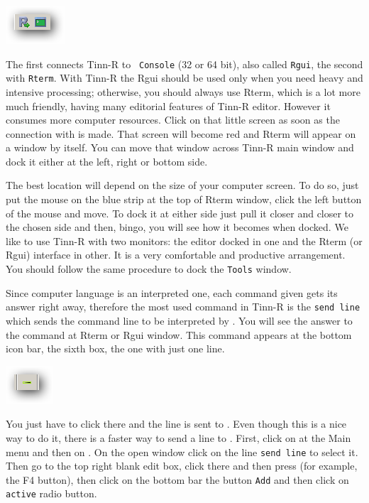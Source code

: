 \includegraphics[scale=0.50]{./res/secrets_connecting.png}

The first connects Tinn-R to \texttt{\RR{} Console} (32 or 64 bit), also called \texttt{Rgui},
the second with \texttt{Rterm}. With Tinn-R the Rgui should be used only when you need heavy and intensive processing;
otherwise, you should always use Rterm, which is a lot more much friendly, having many editorial features of Tinn-R editor.
However it consumes more computer resources. Click on that little screen as soon as the connection with \RR{} is made.
That screen will become red and Rterm will appear on a window by itself. You can move that window across Tinn-R main
window and dock it either at the left, right or bottom side.

The best location will depend on the size of your computer screen. To do so, just put the mouse on the blue strip
at the top of Rterm window, click the left button of the mouse and move.
To dock it at either side just pull it closer and closer to the chosen side and then, bingo,
you will see how it becomes when docked. We like to use Tinn-R with two monitors:
the editor docked in one and the Rterm (or Rgui) interface in other.
It is a very comfortable and productive arrangement.
You should follow the same procedure to dock the \texttt{Tools} window.

Since \RR{} computer language is an interpreted one, each command given gets its answer right away,
therefore the most used command in Tinn-R is the \texttt{send line} which sends the command line to be interpreted by \RR{}.
You will see the answer to the command at Rterm or Rgui window.
This command appears at the bottom icon bar, the sixth box, the one with just one line.

\includegraphics[scale=0.50]{./res/secrets_sendline.png}

You just have to click there and the line is sent to \RR{}. Even though this is a nice way to do it,
there is a faster way to send a line to \RR{}. First, click on \RR{} at the Main menu and then on
.
On the open window click on the line \texttt{send line} to select it.
Then go to the top right blank edit box, click there and then press (for example, the F4 button),
then click on the bottom bar the button \texttt{Add} and then click on \texttt{active} radio button.

